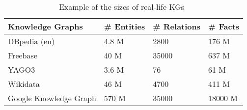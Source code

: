 \begin{table}[t]
\centering


\begin{tabular}{@{}llll@{}}
\toprule
Knowledge Graphs       & \# Entities & \# Relations & \# Facts \\ \midrule
DBpedia (en)%
					   &      4.8 M  &       2800       &   176 M       \\
Freebase			   &     40 M    &      35000   &    637 M \\
YAGO3%
 &      3.6 M   &       76   &   61 M  \\
Wikidata%
&      46 M   &       4700   &   411 M  \\
Google Knowledge Graph &      570 M  &       35000  &   18000 M\\ \bottomrule
\end{tabular}
\caption{Example of the sizes of real-life KGs~\cite{Nickel2015ARO,DBLP:journals/semweb/Paulheim17}}
\label{tab:kgs}

\end{table}